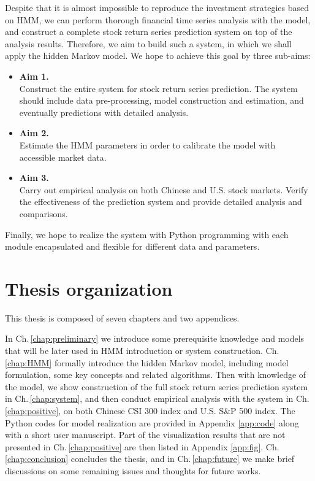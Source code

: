 Despite that it is almost impossible to reproduce the investment strategies based on HMM,
we can perform thorough financial time series analysis with the model,
and construct a complete stock return series prediction system on top of the analysis results.
Therefore, we aim to build such a system,
in which we shall apply the hidden Markov model.
We hope to achieve this goal by three sub-aims:
		\begin{itemize}
		\item \textbf{Aim 1.} \\
		Construct the entire system for stock return series prediction. 
		The system should include data pre-processing, model construction and estimation, 
		and eventually predictions with detailed analysis.
		\item \textbf{Aim 2.} \\
		Estimate the HMM parameters in order to calibrate the model with accessible market data.
		\item \textbf{Aim 3.} \\
		Carry out empirical analysis on both Chinese and U.S. stock markets. 
		Verify the effectiveness of the prediction system and provide detailed analysis and comparisons.
		\end{itemize}
Finally, we hope to realize the system with Python programming with
each module encapsulated and flexible for different data and parameters.


\section{Thesis organization}
\label{sec:introduction:organization}
This thesis is composed of seven chapters and two appendices.

In Ch.\,\ref{chap:preliminary} we introduce some prerequisite
knowledge and models that will be later used in HMM introduction or system construction.
Ch.\,\ref{chap:HMM} formally introduce the hidden Markov model,
including model formulation, some key concepts and related algorithms.
Then with knowledge of the model, 
we show construction of the full stock return series prediction system in Ch.\,\ref{chap:system},
and then conduct empirical analysis with the system in Ch.\,\ref{chap:positive},
on both Chinese CSI 300 index and U.S. S\&P 500 index.
The Python codes for model realization are provided in Appendix \ref{app:code} 
along with a short user manuscript.
Part of the visualization results that are not presented in Ch.\,\ref{chap:positive} 
are then listed in Appendix \ref{app:fig}.
Ch.\,\ref{chap:conclusion} concludes the thesis,
and in Ch.\,\ref{chap:future} we make brief discussions on some remaining issues 
and thoughts for future works.

